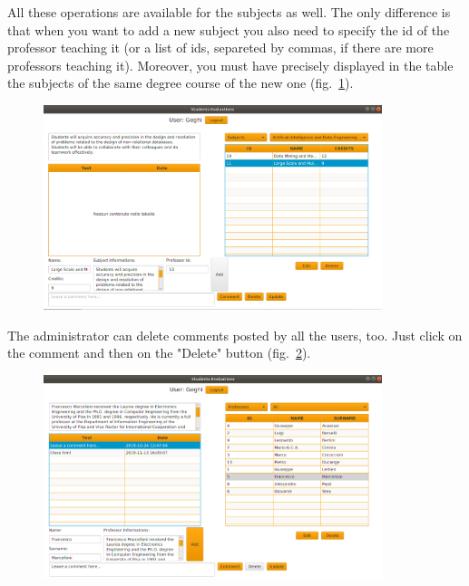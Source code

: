\documentclass[a4paper, oneside]{article}
\begin{document}
All these operations are available for the subjects as well. The only difference is that when you want to add a new subject you also need to specify the id of the professor teaching it (or a list of ids, separeted by commas, if there are more professors teaching it). Moreover, you must have precisely displayed in the table the subjects of the same degree course of the new one (fig.~\ref{fig:admin3}).
\begin{figure}[h]
\centering
\includegraphics[width=0.88\textwidth]{images/screens/admin3}
\label{fig:admin3}
\end{figure}
\clearpage
The administrator can delete comments posted by all the users, too. Just click on the comment and then on the "Delete" button (fig.~\ref{fig:admin4}).
\begin{figure}[h]
\centering
\includegraphics[width=0.88\textwidth]{images/screens/admin4}
\label{fig:admin4}
\end{figure}
\end{document}
